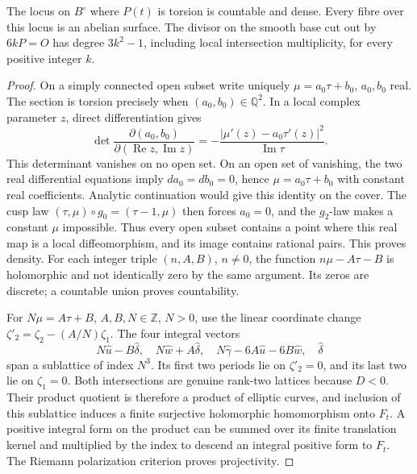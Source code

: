 \begin{proposition}\label{st:D.1.2}
The locus on \(B^\circ\) where \(P(t)\) is torsion is countable and dense.
Every fibre over this locus is an abelian surface. The divisor on the
smooth base cut out by \(6kP=O\) has degree \(3k^2-1\), including local
intersection multiplicity, for every positive integer \(k\).
\end{proposition}
\begin{proof}
On a simply connected open subset write uniquely
\(\mu=a_0\tau+b_0\), \(a_0,b_0\) real. The section is torsion precisely
when \((a_0,b_0)\in\mathbb Q^2\). In a local complex parameter \(z\), direct
differentiation gives
\[
 \det\frac{\partial(a_0,b_0)}{\partial(\operatorname{Re}z,
 \operatorname{Im}z)}
 =-\frac{|\mu'(z)-a_0\tau'(z)|^2}{\operatorname{Im}\tau}.
\]
This determinant vanishes on no open set. On an open set of vanishing,
the two real differential equations imply \(da_0=db_0=0\), hence
\(\mu=a_0\tau+b_0\) with constant real coefficients. Analytic continuation
would give this identity on the cover. The cusp law
\((\tau,\mu)\circ g_0=(\tau-1,\mu)\) then forces \(a_0=0\), and the
\(g_2\)-law makes a constant \(\mu\) impossible. Thus every open subset
contains a point where this real map is a local diffeomorphism, and its
image contains rational pairs. This proves density. For each integer
triple \((n,A,B)\), \(n\ne0\), the function \(n\mu-A\tau-B\) is
holomorphic and not identically zero by the same argument. Its zeros are
discrete; a countable union proves countability.

For \(N\mu=A\tau+B\), \(A,B,N\in\mathbb Z\), \(N>0\), use the linear
coordinate change \(\zeta'_2=\zeta_2-(A/N)\zeta_1\).
The four integral vectors
\[
 N\widehat u-B\widehat\delta,\quad
 N\widehat w+A\widehat\delta,\quad
 N\widehat\gamma-6A\widehat u-6B\widehat w,\quad
 \widehat\delta
\]
span a sublattice of index \(N^3\). Its first two periods lie on
\(\zeta'_2=0\), and its last two lie on \(\zeta_1=0\).
Both intersections are genuine rank-two lattices because \(D<0\).
Their product quotient is therefore a product of elliptic curves, and
inclusion of this sublattice induces a finite surjective holomorphic
homomorphism onto \(F_t\). A positive integral form on the product can
be summed over its finite translation kernel and multiplied by the
index to descend an integral positive form to \(F_t\). The Riemann
polarization criterion proves projectivity.


\end{proof}
